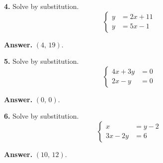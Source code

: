 \documentclass{ximera}
\begin{document}
\begin{problem}

\textbf{4.} Solve by substitution.
\[
  \left\{\begin{aligned}
    y &= 2x+11 \\
    y &= 5x-1
  \end{aligned}\right.
\]

\begin{hint}
\textbf{Answer.} $(4,\,19)$.
\end{hint}
\end{problem}

\begin{problem}

\textbf{5.} Solve by substitution.
\[
  \left\{\begin{aligned}
    4x+3y &= 0 \\
    2x-y &= 0
  \end{aligned}\right.
\]

\begin{hint}
\textbf{Answer.} $(0,\,0)$.
\end{hint}
\end{problem}

\begin{problem}

\textbf{6.} Solve by substitution.
\[
  \left\{\begin{aligned}
    x &= y-2 \\
    3x-2y &= 6
  \end{aligned}\right.
\]

\begin{hint}
\textbf{Answer.} $(10,\,12)$.
\end{hint}
\end{problem}
\end{document}
